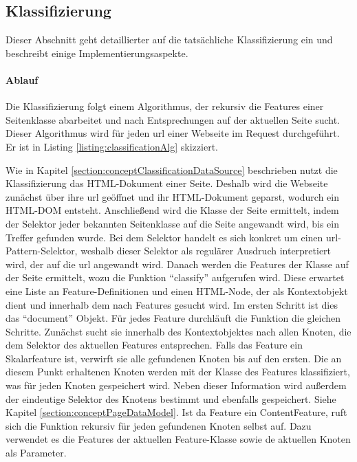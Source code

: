 \subsection{Klassifizierung}
    \label{section:solutionDetailsClassificationServiceClassification}
    Dieser Abschnitt geht detaillierter auf die tatsächliche Klassifizierung ein
    und beschreibt einige Implementierungsaspekte.

    \paragraph{Ablauf}
    Die Klassifizierung folgt einem Algorithmus,
    der rekursiv die Features einer Seitenklasse abarbeitet und nach Entsprechungen
    auf der aktuellen Seite sucht.
    Dieser Algorithmus wird für jeden \gls{url} einer Webseite im  Request durchgeführt.
    Er ist in Listing \ref{listing:classificationAlg} skizziert.

    

    Wie in Kapitel \ref{section:conceptClassificationDataSource} beschrieben
    nutzt die Klassifizierung das HTML-Dokument einer Seite.
    Deshalb wird die Webseite zunächst über ihre \gls{url} geöffnet und ihr HTML-Dokument geparst,
    wodurch ein HTML-DOM entsteht.%
    Anschließend wird die Klasse der Seite ermittelt, indem der Selektor jeder bekannten
    Seitenklasse auf die Seite angewandt wird, bis ein Treffer gefunden wurde.
    Bei dem Selektor handelt es sich konkret um einen \gls{url}-Pattern-Selektor,
    weshalb dieser Selektor als regulärer Ausdruch interpretiert wird,
    der auf die \gls{url} angewandt wird.
    Danach werden die Features der Klasse auf der Seite ermittelt,
    wozu die Funktion "`classify"' aufgerufen wird.
    Diese erwartet eine Liste an Feature-Definitionen und einen HTML-Node,
    der als Kontextobjekt dient und innerhalb dem nach Features gesucht wird.
    Im ersten Schritt ist dies das "`document"' Objekt. %
    Für jedes Feature durchläuft die Funktion die gleichen Schritte.
    Zunächst sucht sie innerhalb des Kontextobjektes nach allen Knoten,
    die dem Selektor des aktuellen Features entsprechen.
    Falls das Feature ein Skalarfeature ist, verwirft sie alle gefundenen Knoten bis auf den ersten.
    Die an diesem Punkt erhaltenen Knoten werden mit der Klasse des Features klassifiziert,
    was für jeden Knoten gespeichert wird.
    Neben dieser Information wird außerdem der eindeutige Selektor des Knotens bestimmt und ebenfalls gespeichert.
    Siehe Kapitel \ref{section:conceptPageDataModel}.
    Ist da Feature ein ContentFeature, ruft sich die Funktion rekursiv für jeden gefundenen Knoten selbst auf.
    Dazu verwendet es die Features der aktuellen Feature-Klasse sowie de aktuellen Knoten als Parameter.

